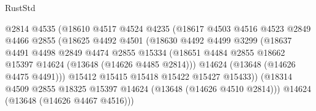 \begin{lexlean}{RustStd}
\begin{coremodule}
                                    @2814
                                    @4535
                                    (@18610
                                      @4517
                                      @4524
                                      @4235
                                      (@18617
                                        @4503
                                        @4516
                                        @4523
                                        @2849
                                        @4466
                                        @2855
                                        (@18625
                                          @4492
                                          @4501
                                          (@18630
                                            @4492
                                            @4499
                                            @3299
                                            (@18637
                                              @4491
                                              @4498
                                              @2849
                                              @4474
                                              @2855
                                              @15334
                                              (@18651
                                                @4484
                                                @2855
                                                @18662
                                                @15397
                                                @14624
                                                (@13648 (@14626 @4485 @2814)))
                                              @14624
                                              (@13648 (@14626 @4475 @4491)))
                                            @15412
                                            @15415
                                            @15418
                                            @15422
                                            @15427
                                            @15433))
                                        (@18314
                                          @4509
                                          @2855
                                          @18325
                                          @15397
                                          @14624
                                          (@13648 (@14626 @4510 @2814)))
                                        @14624
                                        (@13648 (@14626 @4467 @4516)))

\end{coremodule}
\end{lexlean}
